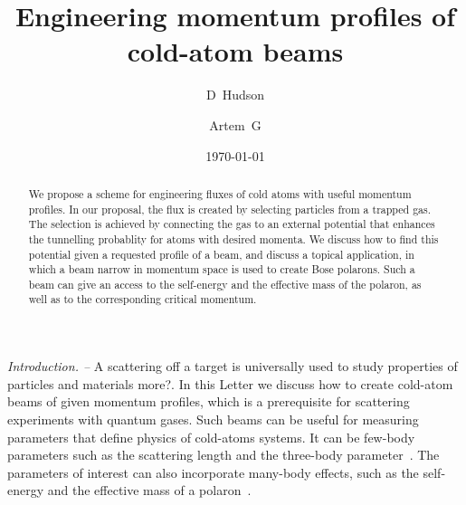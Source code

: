 \documentclass[twocolumn,amsmath,amssymb,showpacs,prl,superscriptaddress,aps]{revtex4-1}
\begin{document}
\title{Engineering momentum profiles of cold-atom beams}

\author{D~Hudson }

\author{Artem~G }


\date{\today}

\begin{abstract}
We propose a scheme for engineering fluxes of cold atoms with useful momentum profiles. 
In our proposal, the flux is created by selecting particles from a trapped gas.
The selection is achieved by connecting the gas to an external potential that enhances
the tunnelling probablity for atoms with desired momenta. 
We discuss how to find this potential given a requested profile 
of a beam, and discuss a topical application, in which a beam narrow in momentum space 
is used to create Bose polarons. Such a beam can give an access to the self-energy and the effective 
mass of the polaron, as well as to the corresponding critical momentum.
\end{abstract}


\maketitle



{\it Introduction. --} 
A scattering off a target is
universally used to study properties of particles and materials {\color{blue} more?}.  
In this Letter we discuss how to create cold-atom beams
of given momentum profiles, which is a prerequisite for scattering experiments
with quantum gases. 
Such beams can be useful for measuring parameters that define
physics of cold-atoms systems. It can be few-body parameters such as
the scattering length and the three-body parameter~\cite{braaten2006, bloch2008}.
The parameters of interest can also incorporate many-body effects, such as the self-energy and the effective mass of a polaron~\cite{massignan2014, schmidt2018}.
\end{document}

